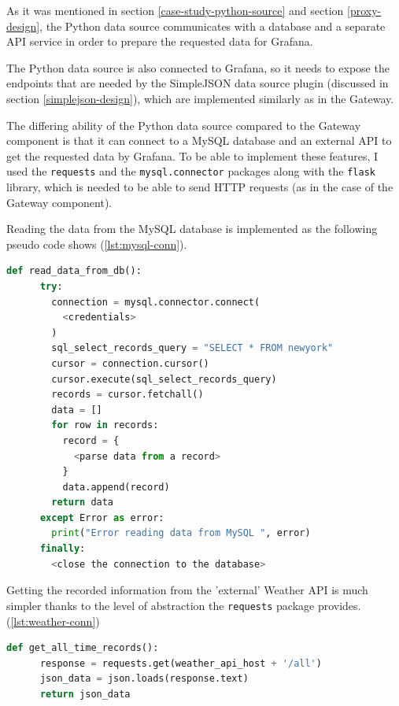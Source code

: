 As it was mentioned in section \ref{case-study-python-source} and section \ref{proxy-design}, the Python data source communicates with a database and a separate API service in order to prepare the requested data for Grafana.

The Python data source is also connected to Grafana, so it needs to expose the endpoints that are needed by the SimpleJSON data source plugin (discussed in section \ref{simplejson-design}), which are implemented similarly as in the Gateway.

The differing ability of the Python data source compared to the Gateway  component is that it can connect to a MySQL database and an external API to get the requested data by Grafana. To be able to implement these features, I used the \texttt{requests} and the \texttt{mysql.connector} packages along with the \texttt{flask} library, which is needed to be able to send HTTP requests (as in the case of the Gateway component).


Reading the data from the MySQL database is implemented as the following pseudo code shows (\ref{lst:mysql-conn}).

\vspace{0.5cm}
\begin{minipage}[b]{\linewidth}
	\centering
	\begin{lstlisting}[language=Python, frame=single, mathescape,%
	caption={Reading data from MySQL}, label=lst:mysql-conn]
	def read_data_from_db():
	  try:
	    connection = mysql.connector.connect(
	      <credentials>
	    )
	    sql_select_records_query = "SELECT * FROM newyork"
	    cursor = connection.cursor()
	    cursor.execute(sql_select_records_query)
	    records = cursor.fetchall()
	    data = []
	    for row in records:
	      record = {
	        <parse data from a record>
	      }
	      data.append(record)
	    return data
	  except Error as error:
	    print("Error reading data from MySQL ", error)
	  finally:
	    <close the connection to the database>
	\end{lstlisting}
\end{minipage}

Getting the recorded information from the 'external' Weather API is much simpler thanks to the level of abstraction the \texttt{requests} package provides. (\ref{lst:weather-conn})

\vspace{0.5cm}
\begin{minipage}[b]{\linewidth}
	\centering
	\begin{lstlisting}[language=Python, frame=single, mathescape,%
	caption={Reading data from the Weather API}, label=lst:weather-conn]
	def get_all_time_records():
	  response = requests.get(weather_api_host + '/all')
	  json_data = json.loads(response.text)
	  return json_data
	\end{lstlisting}
\end{minipage}

